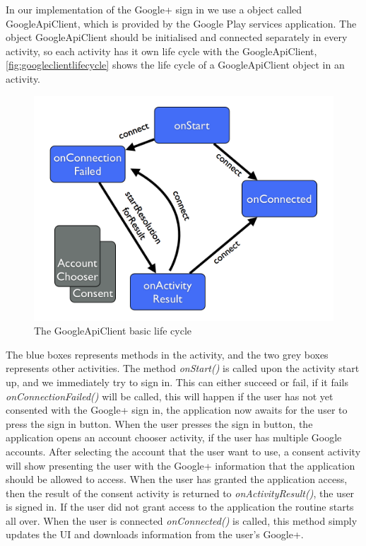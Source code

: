In our implementation of the Google+ sign in we use a object called \\GoogleApiClient\citep{googleapiclient-docs}, which is provided by the Google Play services application. 
The object GoogleApiClient should be initialised and connected separately in every activity, so each activity has it own life cycle with the GoogleApiClient, \autoref{fig:googleclientlifecycle} shows the life cycle of a GoogleApiClient object in an activity.
\begin{figure}[H]
\centering
\includegraphics[width=0.75\linewidth]{img/googleclientflow.png}
\caption{The GoogleApiClient basic life cycle\cite{googleapiclient-lifecycle}}
\label{fig:googleclientlifecycle}
\end{figure}
The blue boxes represents methods in the activity, and the two grey boxes represents other activities. The method \textit{onStart()} is called upon the activity start up, and we immediately try to sign in. 
This can either succeed or fail, if it fails \textit{onConnectionFailed()} will be called, this will happen if the user has not yet consented with the Google+ sign in, the application now awaits for the user to press the sign in button. 
When the user presses the sign in button, the application opens an account chooser activity, if the user has multiple Google accounts. 
After selecting the account that the user want to use, a consent activity will show presenting the user with the Google+ information that the application should be allowed to access. 
When the user has granted the application access, then the result of the consent activity is returned to \textit{onActivityResult()}, the user is signed in. 
If the user did not grant access to the application the routine starts all over. When the user is connected \textit{onConnected()} is called, this method simply updates the UI and downloads information from the user's Google+. 


